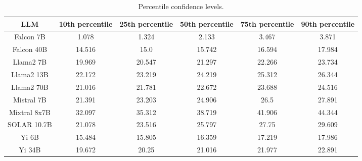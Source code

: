 \begin{table*}
\centering
\begin{tabular}{c|c|c|c|c|c}
LLM & 10th percentile & 25th percentile & 50th percentile & 75th percentile & 90th percentile\\ \hline
Falcon 7B & 1.078 & 1.324 & 2.133 & 3.467 & 3.871\\
Falcon 40B & 14.516 & 15.0 & 15.742 & 16.594 & 17.984\\
Llama2 7B & 19.969 & 20.547 & 21.297 & 22.266 & 23.734\\
Llama2 13B & 22.172 & 23.219 & 24.219 & 25.312 & 26.344\\
Llama2 70B & 21.016 & 21.781 & 22.672 & 23.688 & 24.516\\
Mistral 7B & 21.391 & 23.203 & 24.906 & 26.5 & 27.891\\
Mixtral 8x7B & 32.097 & 35.312 & 38.719 & 41.906 & 44.344\\
SOLAR 10.7B & 21.078 & 23.516 & 25.797 & 27.75 & 29.609\\
Yi 6B & 15.484 & 15.805 & 16.359 & 17.219 & 17.986\\
Yi 34B & 19.672 & 20.25 & 21.016 & 21.977 & 22.891\\
\hline
\end{tabular}
\caption{Percentile confidence levels.}
\label{tab:percentile_conf}
\end{table*}

